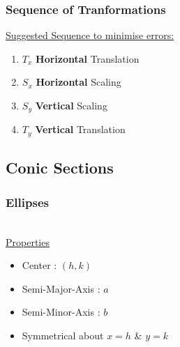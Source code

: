 \documentclass[../main.tex]{subfiles}
\begin{document}
\newpage \noindent

\subsubsection{Sequence of Tranformations}
\underline{Suggested Sequence to minimise errors:}
\begin{enumerate}
    \item \(T_{x}\) \textbf{Horizontal} Translation
    \item \(S_{x}\) \textbf{Horizontal} Scaling
    \item \(S_{y}\) \textbf{Vertical} Scaling
    \item \(T_{y}\) \textbf{Vertical} Translation
\end{enumerate}

\subsection{Conic Sections}

\subsubsection{Ellipses}
 \\
\underline{Properties}
\begin{itemize}
    \item Center : \((h,k)\)
    \item Semi-Major-Axis : \(a\)
    \item Semi-Minor-Axis : \(b\)
    \item Symmetrical about \(x=h\) \& \(y=k\)
\end{itemize}

\newpage \noindent
\end{document}
